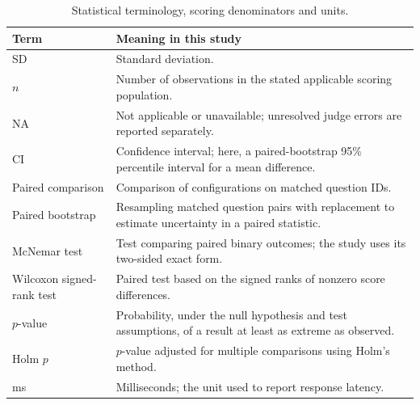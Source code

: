 \begin{table}[H]
\centering
\caption{Statistical terminology, scoring denominators and units.}
\label{tab:statistical-terminology}
{\small
\renewcommand{\arraystretch}{1.08}
\begin{tabular}{|p{}|p{}|}
\hline
\textbf{Term} & \textbf{Meaning in this study} \\
\hline
SD & Standard deviation. \\
$n$ & Number of observations in the stated applicable scoring population. \\
NA & Not applicable or unavailable; unresolved judge errors are reported separately. \\
CI & Confidence interval; here, a paired-bootstrap 95\% percentile interval for a mean difference. \\
Paired comparison & Comparison of configurations on matched question IDs. \\
Paired bootstrap & Resampling matched question pairs with replacement to estimate uncertainty in a paired statistic. \\
McNemar test & Test comparing paired binary outcomes; the study uses its two-sided exact form. \\
Wilcoxon signed-rank test & Paired test based on the signed ranks of nonzero score differences. \\
$p$-value & Probability, under the null hypothesis and test assumptions, of a result at least as extreme as observed. \\
Holm $p$ & $p$-value adjusted for multiple comparisons using Holm's method. \\
ms & Milliseconds; the unit used to report response latency. \\
\hline
\end{tabular}%
}
\end{table}

